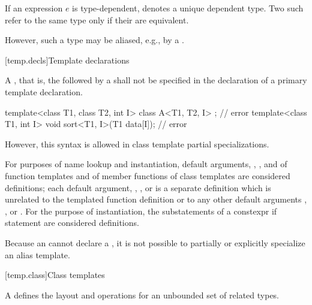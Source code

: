 \pnum
If an expression $e$ is type-dependent,
denotes a unique dependent type. Two such 
refer to the same type only if their  are
equivalent.
\begin{note} However, such a type may be aliased,
e.g., by a . \end{note}

[temp.decls]{Template declarations}

\pnum
A
,
that is, the
followed by a
shall not be specified in the declaration of a primary template declaration.
\begin{example}

\begin{codeblock}
template<class T1, class T2, int I> class A<T1, T2, I> { };     // error
template<class T1, int I> void sort<T1, I>(T1 data[I]);         // error
\end{codeblock}
\end{example}
\begin{note}
However, this syntax is allowed in class template partial specializations.
\end{note}

\pnum
For purposes of name lookup and instantiation,
default arguments,
,
,
and
of function templates
and
of member functions of class templates
are considered definitions;
each
default argument,
,
,
or
is a separate definition
which is unrelated
to the templated function definition or
to any other
default arguments
,
,
or
.
For the purpose of instantiation, the substatements of a constexpr if
statement are considered definitions.

\pnum
Because an  cannot declare a
, it is not possible to partially or
explicitly specialize an alias template.

[temp.class]{Class templates}

\pnum
A
defines the layout and operations
for an unbounded set of related types.


